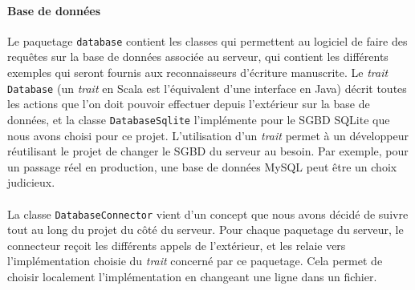 \paragraph{Base de données}
Le paquetage \texttt{database} contient les classes qui permettent au logiciel de faire des requêtes sur la base de données associée au serveur, qui contient les différents exemples qui seront fournis aux reconnaisseurs d'écriture manuscrite. Le \textit{trait} \texttt{Database} (un \textit{trait} en Scala est l'équivalent d'une interface en Java) décrit toutes les actions que l'on doit pouvoir effectuer depuis l'extérieur sur la base de données, et la classe \texttt{DatabaseSqlite} l'implémente pour le SGBD SQLite que nous avons choisi pour ce projet. L'utilisation d'un \textit{trait} permet à un développeur réutilisant le projet de changer le SGBD du serveur au besoin. Par exemple, pour un passage réel en production, une base de données MySQL peut être un choix judicieux. 

\paragraph{}
La classe \texttt{DatabaseConnector} vient d'un concept que nous avons décidé de suivre tout au long du projet du côté du serveur. Pour chaque paquetage du serveur, le connecteur reçoit les différents appels de l'extérieur, et les relaie vers l'implémentation choisie du \textit{trait} concerné par ce paquetage. Cela permet de choisir localement l'implémentation en changeant une ligne dans un fichier.

